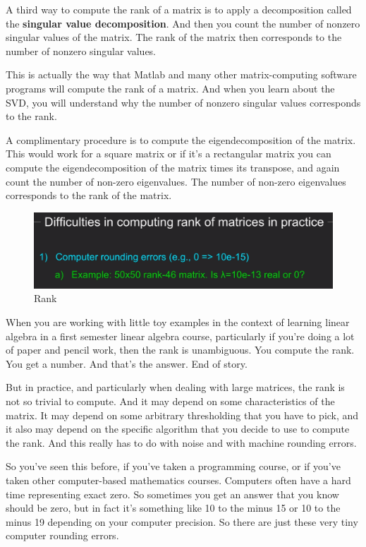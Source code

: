 \documentclass[fleqn,10pt]{olplainarticle}
\theoremstyle{definition}
\theoremstyle{remark}
\begin{document}
A third way to compute the rank of a matrix is to apply a decomposition called the \textbf{singular value decomposition}. And then you count the number of nonzero singular values of the matrix. The rank of the matrix then corresponds to the number of nonzero singular values.

This is actually the way that Matlab and many other matrix-computing software programs will compute the rank of a matrix. And when you learn about the SVD, you will understand why the number of nonzero singular values corresponds to the rank.

A complimentary procedure is to compute the eigendecomposition of the matrix. This would work for a square matrix or if it's a rectangular matrix you can compute the eigendecomposition of the matrix times its transpose, and again count the number of non-zero eigenvalues. The number of non-zero eigenvalues corresponds to the rank of the matrix.

\begin{figure}[ht]
	\centering
	\includegraphics[width=0.5\linewidth]{images/rank-16.png}
	\caption{Rank}
	\label{fig:rank_16}
\end{figure}

When you are working with little toy examples in the context of learning linear algebra in a first semester linear algebra course, particularly if you're doing a lot of paper and pencil work, then the rank is unambiguous. You compute the rank. You get a number. And that's the answer. End of story.

But in practice, and particularly when dealing with large matrices, the rank is not so trivial to compute. And it may depend on some characteristics of the matrix. It may depend on some arbitrary thresholding that you have to pick, and it also may depend on the specific algorithm that you decide to use to compute the rank. And this really has to do with noise and with machine rounding errors.

So you've seen this before, if you've taken a programming course, or if you've taken other computer-based mathematics courses. Computers often have a hard time representing exact zero. So sometimes you get an answer that you know should be zero, but in fact it's something like 10 to the minus 15 or 10 to the minus 19 depending on your computer precision. So there are just these very tiny computer rounding errors.
\end{document}
